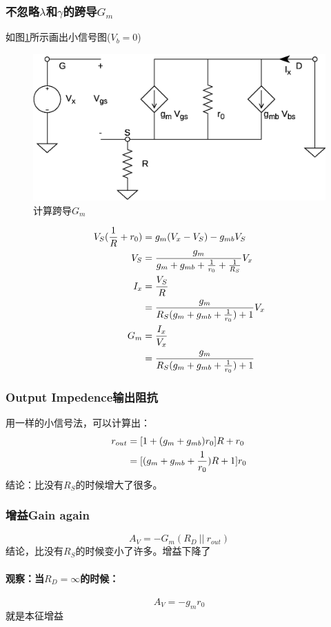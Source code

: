 \documentclass[twoside,a4paper,openright,titlepage,draft]{ctexrep}
\begin{document}
\subsubsection{不忽略$\lambda$和$\gamma$的跨导$G_m$}
如图\ref{fig:计算跨导Gm}所示画出小信号图($V_b = 0$)\\
\begin{figure}[H]
    \centering
    \includegraphics[width=\textwidth]{transconductor.eps}
    \caption{计算跨导$G_m$}
    \label{fig:计算跨导Gm}
\end{figure}
\begin{align}
    V_S(\frac{1}{R} + r_0) &= g_m(V_x - V_S) - g_{mb}V_S \notag \\
    V_S &= \frac{g_m}{g_m + g_{mb} + \frac{1}{r_0} + \frac{1}{R_S}}V_x \notag \\
    I_x &= \frac{V_S}{R} \notag \\
    &= \frac{g_m}{R_S(g_m + g_{mb} + \frac{1}{r_0}) + 1}V_x \notag \\
    G_m &= \frac{I_x}{V_x} \notag \\
    &= \frac{g_m}{R_S(g_m + g_{mb} + \frac{1}{r_0}) + 1}
\end{align}
\subsubsection{Output Impedence输出阻抗}
用一样的小信号法，可以计算出：
\begin{align}
    r_{out} &= [1 + (g_m + g_{mb})r_0]R + r_0 \notag \\
    &= [(g_m + g_{mb} + \frac{1}{r_0})R + 1]r_0
\end{align}
结论：比没有$R_S$的时候增大了很多。
\subsubsection{增益Gain again}
\begin{equation}
    A_V = -G_m(R_D\ ||\ r_{out})
\end{equation}
结论，比没有$R_S$的时候变小了许多。增益下降了
\paragraph{观察：当$R_D=\infty$的时候：}
\begin{equation}
    A_V = -g_mr_0
\end{equation}
就是本征增益
\end{document}
